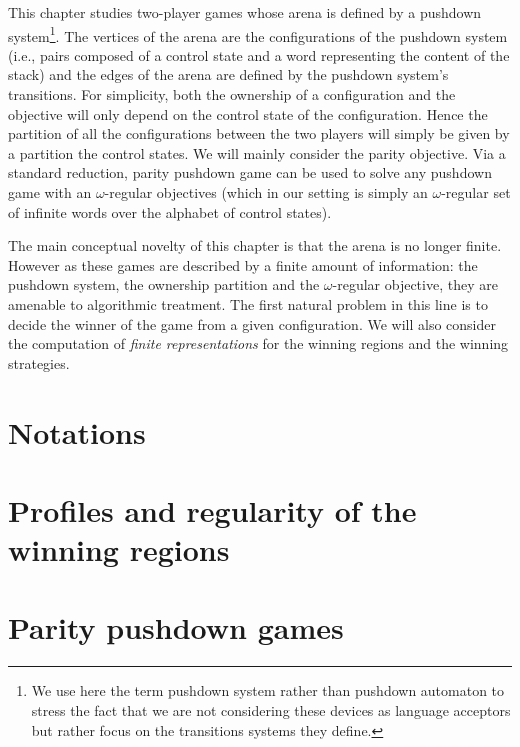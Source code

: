 

This chapter studies two-player games whose arena is defined by a pushdown system\footnote{We use here the term pushdown system rather than pushdown automaton to stress the fact that we are not considering these devices as language acceptors but rather focus on the transitions systems they define.}. The vertices of the arena are the configurations of the pushdown system (i.e., pairs composed of a control state and a word representing the content of the stack) and the edges of the arena are defined by the pushdown system's transitions. For simplicity, both the ownership of a configuration and the objective will only depend on the control state of the configuration. Hence the partition of all the configurations between the two players will simply be given by a partition the control states. We will mainly consider the parity objective. Via a standard reduction, parity pushdown game can be used to solve any pushdown game with an $\omega$-regular objectives (which in our setting is simply an $\omega$-regular set of infinite words over  the alphabet of control states). 

The main conceptual novelty of this chapter is that the arena is no longer finite. However as these games are described by a finite amount of information: the pushdown system, the ownership partition and the $\omega$-regular objective, they are amenable to algorithmic treatment. The first natural problem in this line is to decide the winner of the game from a given configuration. We will also consider the computation of \emph{finite representations} for the winning regions and the winning strategies. 


\section{Notations}
\label{10-sec:notations}


\section{Profiles and regularity of the winning regions}
\label{10-sec:profiles}


\section{Parity pushdown games}
\label{10-sec:parity}



